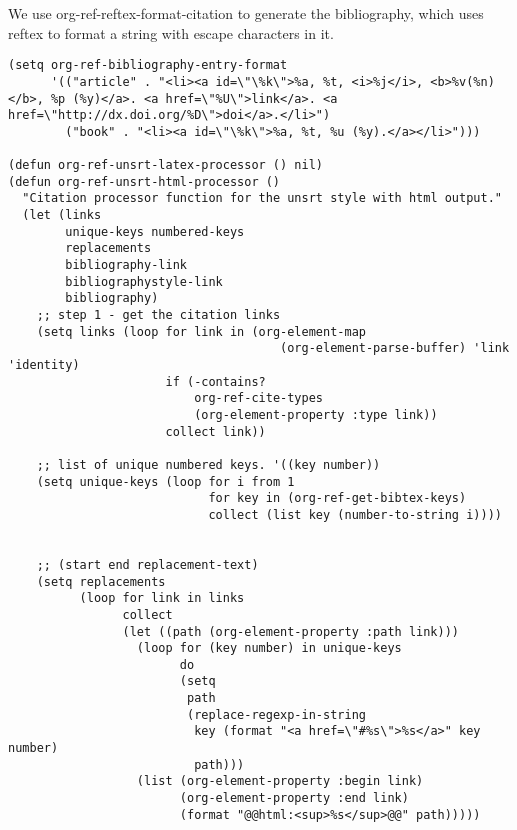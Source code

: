 \documentclass[11pt]{article}
\begin{document}
We use org-ref-reftex-format-citation to generate the bibliography, which uses reftex to format a string with escape characters in it.

\begin{verbatim}
(setq org-ref-bibliography-entry-format
      '(("article" . "<li><a id=\"\%k\">%a, %t, <i>%j</i>, <b>%v(%n)</b>, %p (%y)</a>. <a href=\"%U\">link</a>. <a href=\"http://dx.doi.org/%D\">doi</a>.</li>")
        ("book" . "<li><a id=\"\%k\">%a, %t, %u (%y).</a></li>")))

(defun org-ref-unsrt-latex-processor () nil)
(defun org-ref-unsrt-html-processor ()
  "Citation processor function for the unsrt style with html output."
  (let (links
        unique-keys numbered-keys
        replacements
        bibliography-link
        bibliographystyle-link
        bibliography)
    ;; step 1 - get the citation links
    (setq links (loop for link in (org-element-map
                                      (org-element-parse-buffer) 'link 'identity)
                      if (-contains?
                          org-ref-cite-types
                          (org-element-property :type link))
                      collect link))

    ;; list of unique numbered keys. '((key number))
    (setq unique-keys (loop for i from 1
                            for key in (org-ref-get-bibtex-keys)
                            collect (list key (number-to-string i))))


    ;; (start end replacement-text)
    (setq replacements
          (loop for link in links
                collect
                (let ((path (org-element-property :path link)))
                  (loop for (key number) in unique-keys
                        do
                        (setq
                         path
                         (replace-regexp-in-string
                          key (format "<a href=\"#%s\">%s</a>" key number)
                          path)))
                  (list (org-element-property :begin link)
                        (org-element-property :end link)
                        (format "@@html:<sup>%s</sup>@@" path)))))


\end{verbatim}
\end{document}
